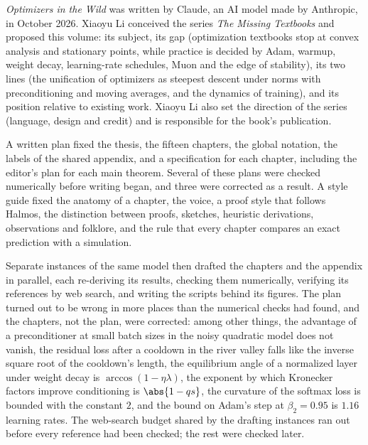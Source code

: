 

\emph{Optimizers in the Wild} was written by Claude, an AI model made by Anthropic, in October 2026. Xiaoyu Li conceived the series \emph{The Missing Textbooks} and proposed this volume: its subject, its gap (optimization textbooks stop at convex analysis and stationary points, while practice is decided by Adam, warmup, weight decay, learning-rate schedules, Muon and the edge of stability), its two lines (the unification of optimizers as steepest descent under norms with preconditioning and moving averages, and the dynamics of training), and its position relative to existing work. Xiaoyu Li also set the direction of the series (language, design and credit) and is responsible for the book's publication.


A written plan fixed the thesis, the fifteen chapters, the global notation, the labels of the shared appendix, and a specification for each chapter, including the editor's plan for each main theorem. Several of these plans were checked numerically before writing began, and three were corrected as a result. A style guide fixed the anatomy of a chapter, the voice, a proof style that follows Halmos, the distinction between proofs, sketches, heuristic derivations, observations and folklore, and the rule that every chapter compares an exact prediction with a simulation.

Separate instances of the same model then drafted the chapters and the appendix in parallel, each re-deriving its results, checking them numerically, verifying its references by web search, and writing the scripts behind its figures. The plan turned out to be wrong in more places than the numerical checks had found, and the chapters, not the plan, were corrected: among other things, the advantage of a preconditioner at small batch sizes in the noisy quadratic model does not vanish, the residual loss after a cooldown in the river valley falls like the inverse square root of the cooldown's length, the equilibrium angle of a normalized layer under weight decay is $\arccos(1-\eta\lambda)$, the exponent by which Kronecker factors improve conditioning is $\abs{1-qs}$, the curvature of the softmax loss is bounded with the constant $2$, and the bound on Adam's step at $\beta_2=0.95$ is $1.16$ learning rates. The web-search budget shared by the drafting instances ran out before every reference had been checked; the rest were checked later.

